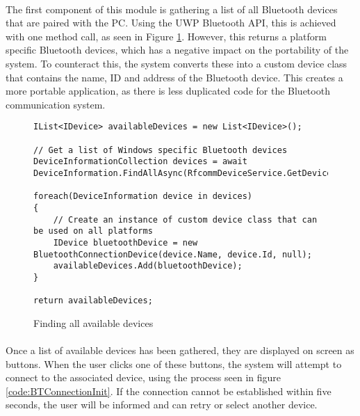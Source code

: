 {		\paragraph{}{
		The first component of this module is gathering a list of all Bluetooth devices that are paired	with the PC. Using the UWP Bluetooth API, this is achieved with one method call, as seen in Figure  \ref{code:AvailableDevices}. However, this returns a platform specific Bluetooth devices, which has a negative impact on the portability of the system. To counteract this, the system converts these into a custom device class that contains the name, ID and address of the Bluetooth device. This creates a more portable application, as there is less duplicated code for the Bluetooth communication system.
		}
		}
		
		\begin{figure}[h]
			\begin{lstlisting}
IList<IDevice> availableDevices = new List<IDevice>();

// Get a list of Windows specific Bluetooth devices
DeviceInformationCollection devices = await DeviceInformation.FindAllAsync(RfcommDeviceService.GetDeviceSelector(RfcommServiceId.SerialPort));

foreach(DeviceInformation device in devices)
{
	// Create an instance of custom device class that can be used on all platforms
	IDevice bluetoothDevice = new BluetoothConnectionDevice(device.Name, device.Id, null);
    availableDevices.Add(bluetoothDevice);
}

return availableDevices;
			\end{lstlisting}
			\caption{Finding all available devices}
			\label{code:AvailableDevices}
		\end{figure}
		
		\paragraph{}{
		Once a list of available devices has been gathered, they are displayed on screen as buttons. When the user clicks one of these buttons, the system will attempt to connect to the associated device, using the process seen in figure \ref{code:BTConnectionInit}. If the connection cannot be established within five seconds, the user will be informed and can retry or select another device.
		}				
		
